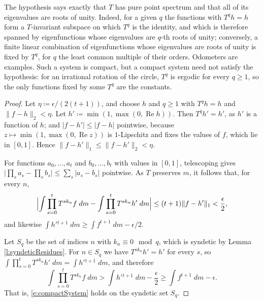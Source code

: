 The hypothesis says exactly that $T$ has pure point spectrum and that all of its eigenvalues are roots of unity.  
Indeed, for a given $q$ the functions with $T ^{q}h=h$ form a $T$-invariant subspace on which $T ^{q}$ is the identity, 
and which is therefore spanned by eigenfunctions whose eigenvalues are $q$-th roots of unity; conversely, a finite linear combination of 
eigenfunctions whose eigenvalues are roots of unity is fixed by $T ^{q}$, for $q$ the least common multiple of their orders.  
Odometers are examples.  Such a system is compact, but a compact system need not satisfy the hypothesis: 
for an irrational rotation of the circle, $T ^{q}$ is ergodic for every $q \geq 1$, so the only functions fixed by some $T ^{q}$ are the constants.  

\begin{proof}
Let $\eta \coloneqq \epsilon /(2(t+1))$, and choose $h$ and $q \geq 1$ with $T ^{q}h = h$ and $\lVert f-h\rVert _2 < \eta$.  
Let $h' \coloneqq \min (1, \max (0, \operatorname{Re} h))$.  Then $T ^{q}h' = h'$, as $h'$ is a function of $h$; 
and $\lvert f - h'\rvert \leq \lvert f-h\rvert$ pointwise, because $z \mapsto \min(1,\max(0,\operatorname{Re} z))$ is $1$-Lipschitz and fixes the values of $f$, which lie in $[0,1]$.  
Hence $\lVert f-h'\rVert _1 \leq \lVert f - h'\rVert _2 < \eta$.  

For functions $a_0 , \ldots, a_t$ and $b_0 , \ldots, b_t$ with values in $[0,1]$, telescoping gives 
$\lvert \prod_s a_s - \prod_s b_s\rvert \leq \sum_s \lvert a_s - b_s\rvert$ pointwise.  As $T$ preserves $m$, it follows that, for every $n$, 
\begin{equation}
\Bigl\lvert \int \prod _{s=0} ^{t} T ^{s k_n } f \;dm - \int \prod _{s=0} ^{t} T ^{s k_n } h' \;dm \Bigr\rvert 
\leq (t+1) \lVert f - h'\rVert _1 < \frac \epsilon 2 , 
\end{equation}
and likewise $\int h' {}^{t+1}\;dm \geq \int f ^{t+1}\;dm - \epsilon/2$.  

Let $S_q$ be the set of indices $n$ with $k_n \equiv 0 \mod q$, which is syndetic by Lemma \ref{l:syndeticResidues}.  
For $n \in S_q$ we have $T ^{sk_n}h' = h'$ for every $s$, so $\int \prod_{s=0}^t T ^{s k_n } h' \;dm = \int h' {}^{t+1}\;dm$, and therefore 
\begin{equation}
\int \prod _{s=0} ^{t} T ^{s k_n } f \;dm > \int h' {}^{t+1}\;dm - \frac \epsilon 2 \geq \int f ^{t+1}\;dm - \epsilon . 
\end{equation}
That is, \eqref{e:compactSystem} holds on the syndetic set $S_q$.  
\end{proof}
